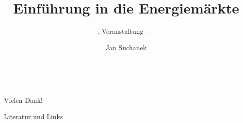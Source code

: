 \documentclass[t,10pt,leqno,aspectratio=43]{beamer}
\subtitle{%
    \thesection. Veranstaltung -- \secname\ %
    }
\title[Einführung in die Energiemärkte \the\year]{Einführung in die Energiemärkte}
\author[Jan Suchanek]{Jan Suchanek}
\begin{document}
\onehalfspacing

\frame{\titlepage}

















\begin{frame}[plain]{}
    \begin{center}
    \Large
    ~\par\vspace{3cm}
    Vielen Dank!
    \end{center}
\end{frame}

\begin{frame}[allowframebreaks]{Literatur und Links}
   \nocite{*}
    \printbibliography
\end{frame}
\end{document}
